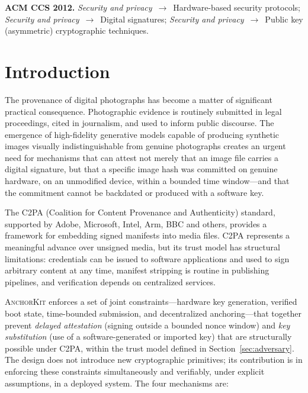 \documentclass[11pt,a4paper]{article}
\newcommand{\AK}{\textsc{AnchorKit}\xspace}
\begin{document}
\medskip
\noindent\textbf{ACM CCS 2012.}
\emph{Security and privacy}~$\to$~Hardware-based security protocols;
\emph{Security and privacy}~$\to$~Digital signatures;
\emph{Security and privacy}~$\to$~Public key (asymmetric) cryptographic techniques.

\section{Introduction}
\label{sec:intro}

The provenance of digital photographs has become a matter of significant
practical consequence.  Photographic evidence is routinely submitted in legal
proceedings, cited in journalism, and used to inform public discourse.  The
emergence of high-fidelity generative models capable of producing synthetic
images visually indistinguishable from genuine photographs creates an urgent
need for mechanisms that can attest not merely that an image file carries a
digital signature, but that a specific image hash was committed on genuine
hardware, on an unmodified device, within a bounded time window---and that the
commitment cannot be backdated or produced with a software key.

The C2PA (Coalition for Content Provenance and Authenticity) standard,
supported by Adobe, Microsoft, Intel, Arm, BBC and others, provides a framework
for embedding signed manifests into media files.  C2PA represents a meaningful
advance over unsigned media, but its trust model has structural limitations:
credentials can be issued to software applications and used to sign arbitrary
content at any time, manifest stripping is routine in publishing pipelines, and
verification depends on centralized services.

\AK enforces a set of joint constraints---hardware key generation, verified
boot state, time-bounded submission, and decentralized anchoring---that together
prevent \emph{delayed attestation} (signing outside a bounded nonce window) and
\emph{key substitution} (use of a software-generated or imported key) that are
structurally possible under C2PA, within the trust model defined in
Section~\ref{sec:adversary}.  The design does not introduce new cryptographic
primitives; its contribution is in enforcing these constraints simultaneously
and verifiably, under explicit assumptions, in a deployed system.  The four
mechanisms are:
\end{document}
